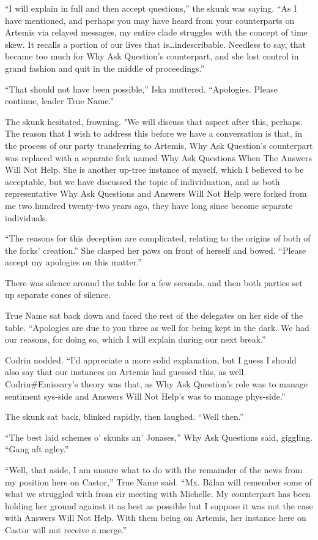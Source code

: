 ``I will explain in full and then accept questions,'' the skunk was saying. ``As I have mentioned, and perhaps you may have heard from your counterparts on Artemis via relayed messages, my entire clade struggles with the concept of time skew. It recalls a portion of our lives that is\ldots indescribable. Needless to say, that became too much for Why Ask Question's counterpart, and she lost control in grand fashion and quit in the middle of proceedings.''

``That should not have been possible,'' Iska muttered. ``Apologies. Please continue, leader True Name.''

The skunk hesitated, frowning. "We will discuss that aspect after this, perhaps. The reason that I wish to address this before we have a conversation is that, in the process of our party transferring to Artemis, Why Ask Question's counterpart was replaced with a separate fork named Why Ask Questions When The Answers Will Not Help. She is another up-tree instance of myself, which I believed to be acceptable, but we have discussed the topic of individuation, and as both representative Why Ask Questions and Answers Will Not Help were forked from me two hundred twenty-two years ago, they have long since become separate individuals.

``The reasons for this deception are complicated, relating to the origins of both of the forks' creation.'' She clasped her paws on front of herself and bowed. ``Please accept my apologies on this matter.''

There was silence around the table for a few seconds, and then both parties set up separate cones of silence.

True Name sat back down and faced the rest of the delegates on her side of the table. ``Apologies are due to you three as well for being kept in the dark. We had our reasons, for doing so, which I will explain during our next break.''

Codrin nodded. ``I'd appreciate a more solid explanation, but I guess I should also say that our instances on Artemis had guessed this, as well. Codrin\#Emissary's theory was that, as Why Ask Question's role was to manage sentiment sys-side and Answers Will Not Help's was to manage phys-side.''

The skunk sat back, blinked rapidly, then laughed. ``Well then.''

``The best laid schemes o' skunks an' Jonases,'' Why Ask Questions said, giggling. ``Gang aft agley.''

``Well, that aside, I am unsure what to do with the remainder of the news from my position here on Castor,'' True Name said. ``Mx. Bălan will remember some of what we struggled with from eir meeting with Michelle. My counterpart has been holding her ground against it as best as possible but I suppose it was not the case with Answers Will Not Help. With them being on Artemis, her instance here on Castor will not receive a merge.''

